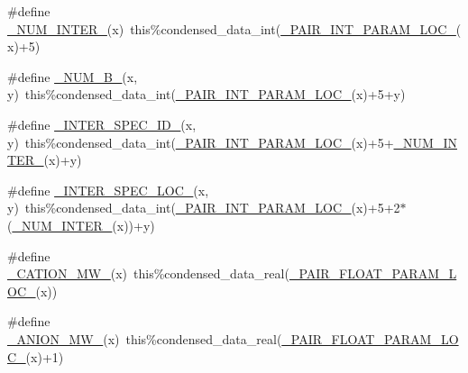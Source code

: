 \begin{DoxyCompactItemize}
\item 
\#define \mbox{\hyperlink{rxn___p_d_fi_t_e__activity_8_f90_af1aac30f931f1688919630c7bf70cba9}{\+\_\+\+N\+U\+M\+\_\+\+I\+N\+T\+E\+R\+\_\+}}(x)~this\%condensed\+\_\+data\+\_\+int(\mbox{\hyperlink{rxn___z_s_r__aerosol__water_8c_abbe1689f26b0329d94a96047259b5679}{\+\_\+\+P\+A\+I\+R\+\_\+\+I\+N\+T\+\_\+\+P\+A\+R\+A\+M\+\_\+\+L\+O\+C\+\_\+}}(x)+5)
\item 
\#define \mbox{\hyperlink{rxn___p_d_fi_t_e__activity_8_f90_ae62675b9842513dffe120a5ec304e47c}{\+\_\+\+N\+U\+M\+\_\+\+B\+\_\+}}(x,  y)~this\%condensed\+\_\+data\+\_\+int(\mbox{\hyperlink{rxn___z_s_r__aerosol__water_8c_abbe1689f26b0329d94a96047259b5679}{\+\_\+\+P\+A\+I\+R\+\_\+\+I\+N\+T\+\_\+\+P\+A\+R\+A\+M\+\_\+\+L\+O\+C\+\_\+}}(x)+5+y)
\item 
\#define \mbox{\hyperlink{rxn___p_d_fi_t_e__activity_8_f90_a1893e87db25c869603f13250a81b0c5c}{\+\_\+\+I\+N\+T\+E\+R\+\_\+\+S\+P\+E\+C\+\_\+\+I\+D\+\_\+}}(x,  y)~this\%condensed\+\_\+data\+\_\+int(\mbox{\hyperlink{rxn___z_s_r__aerosol__water_8c_abbe1689f26b0329d94a96047259b5679}{\+\_\+\+P\+A\+I\+R\+\_\+\+I\+N\+T\+\_\+\+P\+A\+R\+A\+M\+\_\+\+L\+O\+C\+\_\+}}(x)+5+\mbox{\hyperlink{rxn___p_d_fi_t_e__activity_8_f90_af1aac30f931f1688919630c7bf70cba9}{\+\_\+\+N\+U\+M\+\_\+\+I\+N\+T\+E\+R\+\_\+}}(x)+y)
\item 
\#define \mbox{\hyperlink{rxn___p_d_fi_t_e__activity_8_f90_a09165951795c5df7b6ba8d81e3b9d43c}{\+\_\+\+I\+N\+T\+E\+R\+\_\+\+S\+P\+E\+C\+\_\+\+L\+O\+C\+\_\+}}(x,  y)~this\%condensed\+\_\+data\+\_\+int(\mbox{\hyperlink{rxn___z_s_r__aerosol__water_8c_abbe1689f26b0329d94a96047259b5679}{\+\_\+\+P\+A\+I\+R\+\_\+\+I\+N\+T\+\_\+\+P\+A\+R\+A\+M\+\_\+\+L\+O\+C\+\_\+}}(x)+5+2$\ast$(\mbox{\hyperlink{rxn___p_d_fi_t_e__activity_8_f90_af1aac30f931f1688919630c7bf70cba9}{\+\_\+\+N\+U\+M\+\_\+\+I\+N\+T\+E\+R\+\_\+}}(x))+y)
\item 
\#define \mbox{\hyperlink{rxn___p_d_fi_t_e__activity_8_f90_a73731f6029d5bdfbeb5b0646926525da}{\+\_\+\+C\+A\+T\+I\+O\+N\+\_\+\+M\+W\+\_\+}}(x)~this\%condensed\+\_\+data\+\_\+real(\mbox{\hyperlink{rxn___z_s_r__aerosol__water_8c_a870d0d577e7b4aa4f6ff26a97bef9a71}{\+\_\+\+P\+A\+I\+R\+\_\+\+F\+L\+O\+A\+T\+\_\+\+P\+A\+R\+A\+M\+\_\+\+L\+O\+C\+\_\+}}(x))
\item 
\#define \mbox{\hyperlink{rxn___p_d_fi_t_e__activity_8_f90_acf85becb5ac5e829092eae91447ed336}{\+\_\+\+A\+N\+I\+O\+N\+\_\+\+M\+W\+\_\+}}(x)~this\%condensed\+\_\+data\+\_\+real(\mbox{\hyperlink{rxn___z_s_r__aerosol__water_8c_a870d0d577e7b4aa4f6ff26a97bef9a71}{\+\_\+\+P\+A\+I\+R\+\_\+\+F\+L\+O\+A\+T\+\_\+\+P\+A\+R\+A\+M\+\_\+\+L\+O\+C\+\_\+}}(x)+1)

\end{DoxyCompactItemize}
